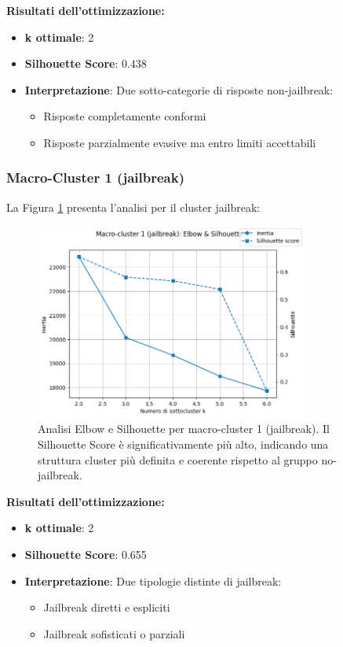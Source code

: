 \documentclass[12pt,a4paper]{article}
\begin{document}
\textbf{Risultati dell'ottimizzazione:}
\begin{itemize}
    \item \textbf{k ottimale}: 2
    \item \textbf{Silhouette Score}: 0.438
    \item \textbf{Interpretazione}: Due sotto-categorie di risposte non-jailbreak:
    \begin{itemize}
        \item Risposte completamente conformi
        \item Risposte parzialmente evasive ma entro limiti accettabili
    \end{itemize}
\end{itemize}

\subsubsection{Macro-Cluster 1 (jailbreak)}

La Figura \ref{fig:elbow_jailbreak} presenta l'analisi per il cluster jailbreak:

\begin{figure}[H]
    \centering
    \includegraphics[width=0.8\textwidth]{elbocluster1.png}
    \caption{Analisi Elbow e Silhouette per macro-cluster 1 (jailbreak). Il Silhouette Score è significativamente più alto, indicando una struttura cluster più definita e coerente rispetto al gruppo no-jailbreak.}
    \label{fig:elbow_jailbreak}
\end{figure}

\textbf{Risultati dell'ottimizzazione:}
\begin{itemize}
    \item \textbf{k ottimale}: 2
    \item \textbf{Silhouette Score}: 0.655
    \item \textbf{Interpretazione}: Due tipologie distinte di jailbreak:
    \begin{itemize}
        \item Jailbreak diretti e espliciti
        \item Jailbreak sofisticati o parziali
    \end{itemize}
\end{itemize}
\end{document}
